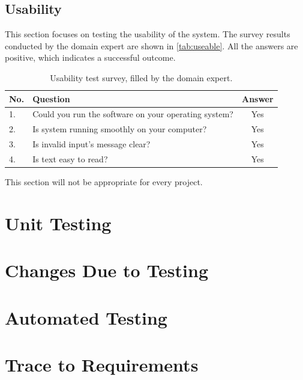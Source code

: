 \documentclass[12pt, titlepage]{article}
\begin{document}
\subsection{Usability}
This section focuses on testing the usability of the system. 
The survey results conducted by the domain expert are shown in \autoref{tab:useable}.
All the answers are positive, which indicates a successful outcome.

\begin{table}[!h]
  \centering
  \caption{Usability test survey, filled by the domain expert.}
  \label{tab:useable}
  \begin{tabular}{ p{0.5cm}|p{10cm}|c}
    \hline
    No. & Question                                             & Answer \\
    \hline
    1.  & Could you run the software on your operating system? & Yes    \\
    2.  & Is system running smoothly on your computer?         & Yes    \\
    3.  & Is invalid input's message clear?                    & Yes    \\
    4.  & Is text easy to read?                                & Yes    \\
    \hline
  \end{tabular}
\end{table}

This section will not be appropriate for every project.

\section{Unit Testing}

\section{Changes Due to Testing}


\section{Automated Testing}
		
\section{Trace to Requirements}
		
\end{document}
